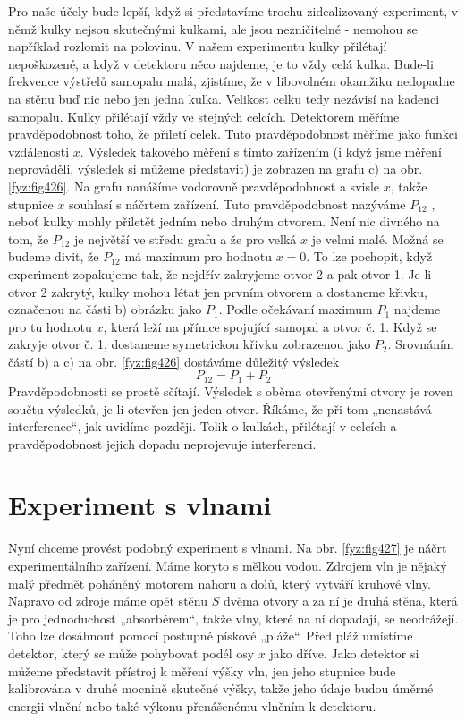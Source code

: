     Pro naše účely bude lepší, když si představíme trochu zidealizovaný experiment, v němž kulky
    nejsou skutečnými kulkami, ale jsou nezničitelné - nemohou se například rozlomit na polovinu. V
    našem experimentu kulky přilétají nepoškozené, a když v detektoru něco najdeme, je to vždy celá
    kulka. Bude-li frekvence výstřelů samopalu malá, zjistíme, že v libovolném okamžiku nedopadne na
    stěnu buď nic nebo jen jedna kulka. Velikost celku tedy nezávisí na kadenci samopalu. Kulky
    přilétají vždy ve stejných celcích. Detektorem měříme pravděpodobnost toho, že přiletí celek.
    Tuto pravděpodobnost měříme jako funkci vzdálenosti \(x\). Výsledek takového měření s tímto
    zařízením (i když jsme měření neprováděli, výsledek si můžeme představit) je zobrazen na grafu
    c) na obr. \ref{fyz:fig426}. Na grafu nanášíme vodorovně pravděpodobnost a svisle \(x\), takže
    stupnice \(x\) souhlasí s náčrtem zařízení. Tuto pravděpodobnost nazýváme \(P_{12}\) , neboť
    kulky mohly přiletět jedním nebo druhým otvorem. Není nic divného na tom, že \(P_{12}\) je
    největší ve středu grafu a že pro velká \(x\) je velmi malé. Možná se budeme divit, že
    \(P_{12}\) má maximum pro hodnotu \(x= 0\). To lze pochopit, když experiment zopakujeme tak, že
    nejdřív zakryjeme otvor 2 a pak otvor 1. Je-li otvor 2 zakrytý, kulky mohou létat jen prvním
    otvorem a dostaneme křivku, označenou na části b) obrázku jako \(P_1\). Podle očekávaní maximum
    \(P_1\) najdeme pro tu hodnotu \(x\), která leží na přímce spojující samopal a otvor č. 1. Když
    se zakryje otvor č. 1, dostaneme symetrickou křivku zobrazenou jako \(P_2\). Srovnáním částí b)
    a c) na obr. \ref{fyz:fig426} dostáváme důležitý výsledek
    \begin{equation}\label{fyz:eq591}
      P_{12} = P_1 + P_2
    \end{equation}
    Pravděpodobnosti se prostě sčítají. Výsledek s oběma otevřenými otvory je roven součtu výsledků,
    je-li otevřen jen jeden otvor. Říkáme, že při tom „nenastává interference“, jak uvidíme později.
    Tolik o kulkách, přilétají v celcích a pravděpodobnost jejich dopadu neprojevuje interferenci.
  
  \section{Experiment s vlnami}\label{fyz:IchapXXXVIIsecIII}
    Nyní chceme provést podobný experiment s vlnami. Na obr. \ref{fyz:fig427} je náčrt
    experimentálního zařízení. Máme koryto s mělkou vodou. Zdrojem vln je nějaký malý předmět poháněný
    motorem nahoru a dolů, který vytváří kruhové vlny. Napravo od zdroje máme opět stěnu \(S\) dvěma
    otvory a za ní je druhá stěna, která je pro jednoduchost „absorbérem“, takže vlny, které na ní
    dopadají, se neodrážejí. Toho lze dosáhnout pomocí postupné pískové „pláže“. Před pláž umístíme
    detektor, který se může pohybovat podél osy \(x\) jako dříve. Jako detektor si můžeme představit
    přístroj k měření výšky vln, jen jeho stupnice bude kalibrována v druhé mocnině skutečné výšky,
    takže jeho údaje budou úměrné energii vlnění nebo také výkonu přenášenému vlněním k detektoru.

